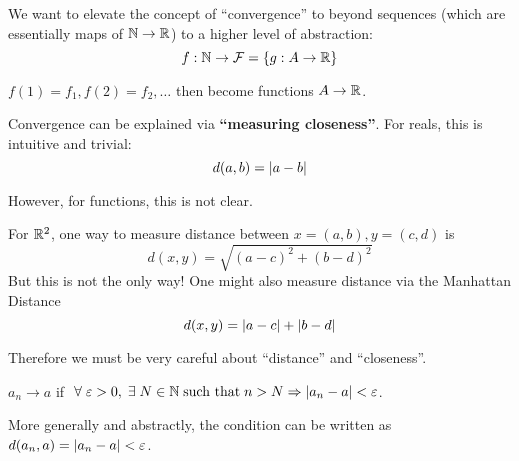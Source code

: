 
\begin{motivation}
    We want to elevate the concept of ``convergence'' to beyond sequences (which are essentially maps of \(\mathbb{N} \to \mathbb{R}\)) to a higher level of abstraction: \[
        f: \mathbb{N} \to \mathcal{F} = \{g: A \to \mathbb{R}\}
    \]

    \(f(1) = f_1, f(2) = f_2, \dots\) then become functions \(A \to \mathbb{R}\).
\end{motivation}


Convergence can be explained via \textbf{``measuring closeness''}. For reals, this is intuitive and trivial: \[
    d(a, b) = \lvert a-b\rvert
\]

However, for functions, this is not clear.
\begin{example}
    For \(\mathbb{R}^2\), one way to measure distance between \(x=(a, b), y=(c, d)\) is \[
    d(x, y) = \sqrt{(a-c)^2 + (b-d)^2}
    \]
    But this is not the only way! One might also measure distance via the Manhattan Distance \[
    d(x, y) = \lvert a-c\rvert + \lvert b-d\rvert
    \]

    Therefore we must be very careful about ``distance'' and ``closeness''.
\end{example}

\begin{recall}
    \(a_n \to a\) if \(\forall \epsilon > 0, \exists N \in \bbn \st n > N \implies \abs{a_n - a} < \epsilon\).
\end{recall}

More generally and abstractly, the condition can be written as \(d(a_n, a) = \lvert a_n-a\rvert < \varepsilon\).

